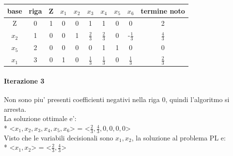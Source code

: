 \documentclass[a4paper,12pt,oneside]{article}
\begin{document}
    \begin{center}
        \begin{tabular}{|c|c|c|c|c|c|c|c|c|c|}
            \hline
            base  & riga & Z & $x_1$ & $x_2$        & $x_3$        & $x_4$        & $x_5$ & $x_6$        & termine noto \\
            \hline
            Z     & 0    & 1 &  0    & 0            &  1           &  1           &  0    & 0            & 2 \\
            $x_2$ & 1    & 0 &  0    & 1            &  $\frac 2 3$ &  $\frac 2 3$ &  0    & -$\frac 1 3$ & $\frac 4 3$ \\
            $x_5$ & 2    & 0 &  0    & 0            &  0           &  1           &  1    & 0            &  0 \\
            $x_1$ & 3    & 0 &  1    & 0            &  $\frac 1 3$ &  $\frac 1 3$ &  0    &  $\frac 1 3$ & $\frac 2 3$ \\
            \hline
        \end{tabular}
    \end{center}

    \paragraph{Iterazione 3}

    Non sono piu' presenti coefficienti negativi nella riga 0, quindi l'algoritmo si arresta. \\

    La soluzione ottimale e': \\*
    <$x_1, x_2, x_3, x_4, x_5, x_6$> = <$\frac 2 3, \frac 4 3, 0, 0, 0, 0$> \\

    Visto che le variabili decisionali sono $x_1, x_2$, la soluzione al problema PL e: \\*
    <$x_1, x_2$> = <$\frac 2 3, \frac 4 3$> \\

    
   
\end{document}

